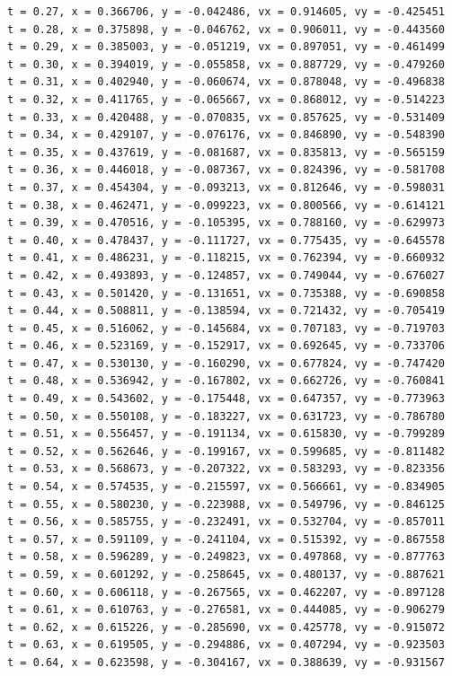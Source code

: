 \documentclass[a4j,titlepage]{jsarticle}
\begin{document}
\begin{lstlisting}[style=text,caption=課題9の実行結果,label=lst:kekka9]
t = 0.27, x = 0.366706, y = -0.042486, vx = 0.914605, vy = -0.425451
t = 0.28, x = 0.375898, y = -0.046762, vx = 0.906011, vy = -0.443560
t = 0.29, x = 0.385003, y = -0.051219, vx = 0.897051, vy = -0.461499
t = 0.30, x = 0.394019, y = -0.055858, vx = 0.887729, vy = -0.479260
t = 0.31, x = 0.402940, y = -0.060674, vx = 0.878048, vy = -0.496838
t = 0.32, x = 0.411765, y = -0.065667, vx = 0.868012, vy = -0.514223
t = 0.33, x = 0.420488, y = -0.070835, vx = 0.857625, vy = -0.531409
t = 0.34, x = 0.429107, y = -0.076176, vx = 0.846890, vy = -0.548390
t = 0.35, x = 0.437619, y = -0.081687, vx = 0.835813, vy = -0.565159
t = 0.36, x = 0.446018, y = -0.087367, vx = 0.824396, vy = -0.581708
t = 0.37, x = 0.454304, y = -0.093213, vx = 0.812646, vy = -0.598031
t = 0.38, x = 0.462471, y = -0.099223, vx = 0.800566, vy = -0.614121
t = 0.39, x = 0.470516, y = -0.105395, vx = 0.788160, vy = -0.629973
t = 0.40, x = 0.478437, y = -0.111727, vx = 0.775435, vy = -0.645578
t = 0.41, x = 0.486231, y = -0.118215, vx = 0.762394, vy = -0.660932
t = 0.42, x = 0.493893, y = -0.124857, vx = 0.749044, vy = -0.676027
t = 0.43, x = 0.501420, y = -0.131651, vx = 0.735388, vy = -0.690858
t = 0.44, x = 0.508811, y = -0.138594, vx = 0.721432, vy = -0.705419
t = 0.45, x = 0.516062, y = -0.145684, vx = 0.707183, vy = -0.719703
t = 0.46, x = 0.523169, y = -0.152917, vx = 0.692645, vy = -0.733706
t = 0.47, x = 0.530130, y = -0.160290, vx = 0.677824, vy = -0.747420
t = 0.48, x = 0.536942, y = -0.167802, vx = 0.662726, vy = -0.760841
t = 0.49, x = 0.543602, y = -0.175448, vx = 0.647357, vy = -0.773963
t = 0.50, x = 0.550108, y = -0.183227, vx = 0.631723, vy = -0.786780
t = 0.51, x = 0.556457, y = -0.191134, vx = 0.615830, vy = -0.799289
t = 0.52, x = 0.562646, y = -0.199167, vx = 0.599685, vy = -0.811482
t = 0.53, x = 0.568673, y = -0.207322, vx = 0.583293, vy = -0.823356
t = 0.54, x = 0.574535, y = -0.215597, vx = 0.566661, vy = -0.834905
t = 0.55, x = 0.580230, y = -0.223988, vx = 0.549796, vy = -0.846125
t = 0.56, x = 0.585755, y = -0.232491, vx = 0.532704, vy = -0.857011
t = 0.57, x = 0.591109, y = -0.241104, vx = 0.515392, vy = -0.867558
t = 0.58, x = 0.596289, y = -0.249823, vx = 0.497868, vy = -0.877763
t = 0.59, x = 0.601292, y = -0.258645, vx = 0.480137, vy = -0.887621
t = 0.60, x = 0.606118, y = -0.267565, vx = 0.462207, vy = -0.897128
t = 0.61, x = 0.610763, y = -0.276581, vx = 0.444085, vy = -0.906279
t = 0.62, x = 0.615226, y = -0.285690, vx = 0.425778, vy = -0.915072
t = 0.63, x = 0.619505, y = -0.294886, vx = 0.407294, vy = -0.923503
t = 0.64, x = 0.623598, y = -0.304167, vx = 0.388639, vy = -0.931567

\end{lstlisting}
\end{document}
